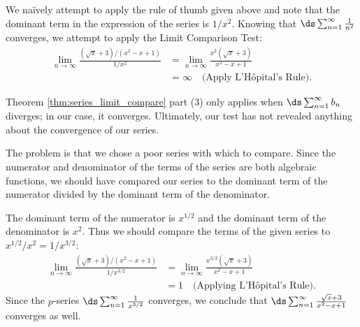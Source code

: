 {We na\"ively attempt to apply the rule of thumb given above and note that the dominant term in the expression of the series is $1/x^2$. Knowing that $\ds \sum_{n=1}^\infty \frac1{n^2}$ converges, we attempt to apply the Limit Comparison Test:
\begin{align*}
\lim_{n\to\infty}\frac{(\sqrt{x}+3)/(x^2-x+1)}{1/x^2} &= \lim_{n\to\infty}\frac{x^2(\sqrt x+3)}{x^2-x+1}\\
		&= \infty \quad \text{(Apply L'H\^opital's Rule)}.
\end{align*}

Theorem \ref{thm:series_limit_compare} part (3) only applies when $\ds\sum_{n=1}^\infty b_n$ diverges; in our case, it converges. Ultimately, our test has not revealed anything about the convergence of our series.

The problem is that we chose a poor series with which to compare. Since the numerator and denominator of the terms of the series are both algebraic functions, we should have compared our series  to the dominant term of the numerator divided by the dominant term of the denominator.

The dominant term of the numerator is $x^{1/2}$ and the dominant term of the denominator is $x^2$. Thus we should compare the terms of the given series to $x^{1/2}/x^2 = 1/x^{3/2}$:
\begin{align*}
\lim_{n\to\infty}\frac{(\sqrt{x}+3)/(x^2-x+1)}{1/x^{3/2}} &= \lim_{n\to \infty} \frac{x^{3/2}(\sqrt x+3)}{x^2-x+1} \\
		&= 1\quad \text{(Applying L'H\^opital's Rule)}.
\end{align*}
Since the  $p$-series $\ds\sum_{n=1}^\infty \frac1{x^{3/2}}$ converges, we conclude that $\ds\sum_{n=1}^\infty \frac{\sqrt{x}+3}{x^2-x+1}$ converges as well.
}\\




